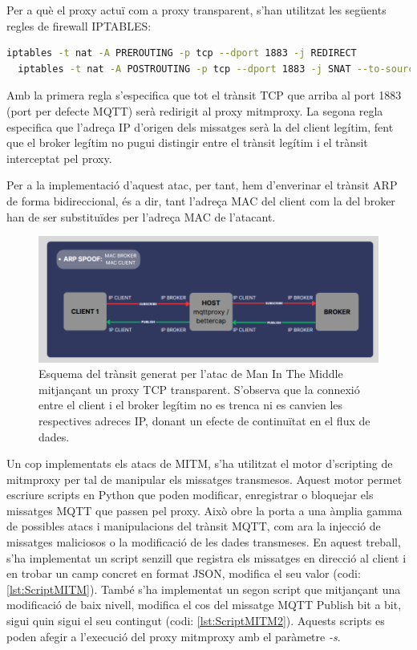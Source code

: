 Per a què el proxy actuï com a proxy transparent, s'han utilitzat les següents regles de firewall IPTABLES:

\begin{lstlisting}[language=bash, caption={Execució iptables}, label=lst:iptables]
  iptables -t nat -A PREROUTING -p tcp --dport 1883 -j REDIRECT
  iptables -t nat -A POSTROUTING -p tcp --dport 1883 -j SNAT --to-source 192.168.0.41
  \end{lstlisting}

  Amb la primera regla s'especifica que tot el trànsit TCP que arriba al port 1883 (port per defecte MQTT) serà redirigit al proxy mitmproxy. La segona regla especifica que l'adreça IP d'origen dels missatges serà la del client legítim, fent que el broker legítim no pugui distingir entre el trànsit legítim i el trànsit interceptat pel proxy.

  Per a la implementació d'aquest atac, per tant, hem d'enverinar el trànsit ARP de forma bidireccional, és a dir, tant l'adreça MAC del client com la del broker han de ser substituïdes per l'adreça MAC de l'atacant.

  \begin{figure}[H]
    \centering
    \includegraphics[width=1\textwidth]{img/mitmproxytransp.png}
    \caption{Esquema del trànsit generat per l'atac de Man In The Middle mitjançant un proxy TCP transparent. S'observa que la connexió entre el client i el broker legítim no es trenca ni es canvien les respectives adreces IP, donant un efecte de continuïtat en el flux de dades.}
    \label{fig:MITMproxyTransparent}
  \end{figure}

  Un cop implementats els atacs de MITM, s'ha utilitzat el motor d'scripting de mitmproxy per tal de manipular els missatges transmesos. Aquest motor permet escriure scripts en Python que poden modificar, enregistrar o bloquejar els missatges MQTT que passen pel proxy. Això obre la porta a una àmplia gamma de possibles atacs i manipulacions del trànsit MQTT, com ara la injecció de missatges maliciosos o la modificació de les dades transmeses. En aquest treball, s'ha implementat un script senzill que registra els missatges en direcció al client i en trobar un camp concret en format JSON, modifica el seu valor (codi: \ref{lst:ScriptMITM}). També s'ha implementat un segon script que mitjançant una modificació de baix nivell, modifica el cos del missatge MQTT Publish bit a bit, sigui quin sigui el seu contingut (codi: \ref{lst:ScriptMITM2}). Aquests scripts es poden afegir a l'execució del proxy mitmproxy amb el paràmetre \textit{-s}.

